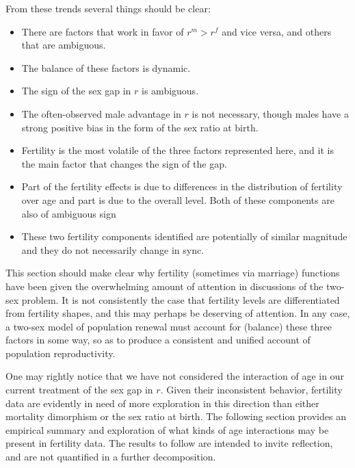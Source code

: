 \FloatBarrier
From these trends several things should be clear:
\begin{itemize}
  \item There are factors that work in favor of $r^m
> r^f$ and vice versa, and others that are ambiguous.
  \item The balance of these factors is dynamic.
  \item The sign of the sex gap in $r$ is ambiguous.
  \item The often-observed male advantage in $r$
is not necessary, though males have a strong positive bias in the form of the
sex ratio at birth.
  \item Fertility is the most volatile of the three factors represented here,
  and it is the main factor that changes the sign of the gap.
  \item Part of the fertility effects is due to differences in the distribution
  of fertility over age and part is due to the overall level. Both of these
  components are also of ambiguous sign
  \item These two fertility components identified are potentially of similar
  magnitude and they do not necessarily change in sync.
\end{itemize}

This section should make clear why fertility (sometimes via marriage) functions
have been given the overwhelming amount of attention in discussions of the two-sex
problem. It is not consistently the case that fertility levels are
differentiated from fertility shapes, and this may perhaps be deserving of
attention. In any case, a two-sex model of population renewal must account for
(balance) these three factors in some way, so as to produce a consistent and 
unified account of population reproductivity.

One may rightly notice that we have not considered the interaction of age in our
current treatment of the sex gap in $r$. Given their inconsistent behavior,
fertility data are evidently in need of more exploration in this direction than
either mortality dimorphism or the sex ratio at birth. The following section 
provides an empirical summary and exploration of what kinds of age interactions
may be present in fertility data. The results to follow are intended to invite
reflection, and are not quantified in a further decomposition. 
 \FloatBarrier
